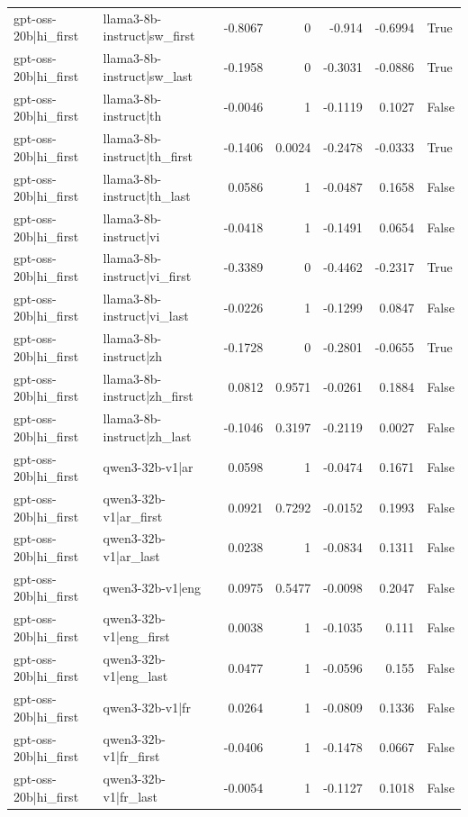 \begin{table}
\begin{tabular}{l l r r r r l}
gpt-oss-20b|hi_first & llama3-8b-instruct|sw_first & -0.8067 & 0 & -0.914 & -0.6994 & True \\
gpt-oss-20b|hi_first & llama3-8b-instruct|sw_last & -0.1958 & 0 & -0.3031 & -0.0886 & True \\
gpt-oss-20b|hi_first & llama3-8b-instruct|th & -0.0046 & 1 & -0.1119 & 0.1027 & False \\
gpt-oss-20b|hi_first & llama3-8b-instruct|th_first & -0.1406 & 0.0024 & -0.2478 & -0.0333 & True \\
gpt-oss-20b|hi_first & llama3-8b-instruct|th_last & 0.0586 & 1 & -0.0487 & 0.1658 & False \\
gpt-oss-20b|hi_first & llama3-8b-instruct|vi & -0.0418 & 1 & -0.1491 & 0.0654 & False \\
gpt-oss-20b|hi_first & llama3-8b-instruct|vi_first & -0.3389 & 0 & -0.4462 & -0.2317 & True \\
gpt-oss-20b|hi_first & llama3-8b-instruct|vi_last & -0.0226 & 1 & -0.1299 & 0.0847 & False \\
gpt-oss-20b|hi_first & llama3-8b-instruct|zh & -0.1728 & 0 & -0.2801 & -0.0655 & True \\
gpt-oss-20b|hi_first & llama3-8b-instruct|zh_first & 0.0812 & 0.9571 & -0.0261 & 0.1884 & False \\
gpt-oss-20b|hi_first & llama3-8b-instruct|zh_last & -0.1046 & 0.3197 & -0.2119 & 0.0027 & False \\
gpt-oss-20b|hi_first & qwen3-32b-v1|ar & 0.0598 & 1 & -0.0474 & 0.1671 & False \\
gpt-oss-20b|hi_first & qwen3-32b-v1|ar_first & 0.0921 & 0.7292 & -0.0152 & 0.1993 & False \\
gpt-oss-20b|hi_first & qwen3-32b-v1|ar_last & 0.0238 & 1 & -0.0834 & 0.1311 & False \\
gpt-oss-20b|hi_first & qwen3-32b-v1|eng & 0.0975 & 0.5477 & -0.0098 & 0.2047 & False \\
gpt-oss-20b|hi_first & qwen3-32b-v1|eng_first & 0.0038 & 1 & -0.1035 & 0.111 & False \\
gpt-oss-20b|hi_first & qwen3-32b-v1|eng_last & 0.0477 & 1 & -0.0596 & 0.155 & False \\
gpt-oss-20b|hi_first & qwen3-32b-v1|fr & 0.0264 & 1 & -0.0809 & 0.1336 & False \\
gpt-oss-20b|hi_first & qwen3-32b-v1|fr_first & -0.0406 & 1 & -0.1478 & 0.0667 & False \\
gpt-oss-20b|hi_first & qwen3-32b-v1|fr_last & -0.0054 & 1 & -0.1127 & 0.1018 & False \\

\end{tabular}
\end{table}
